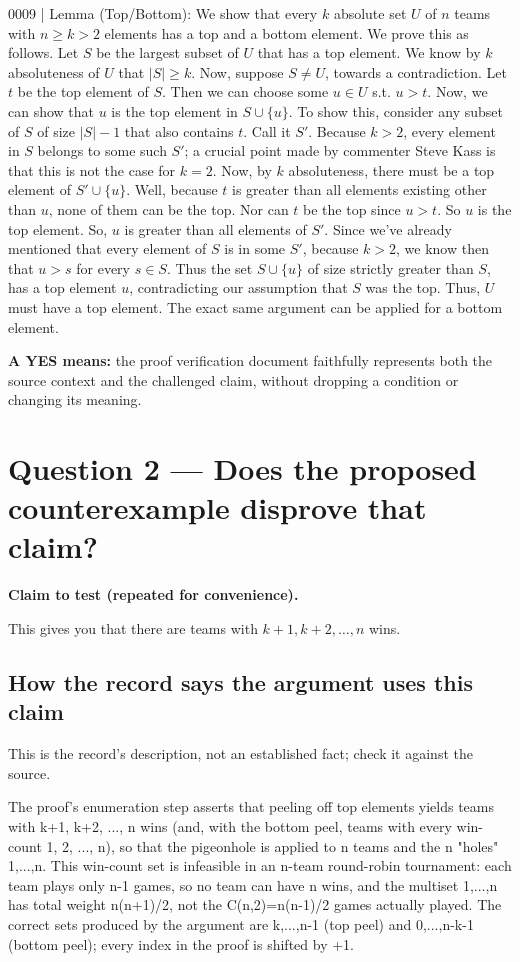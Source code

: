 \documentclass[11pt]{article}
\begin{document}
\begin{Vsrc}
0009 | Lemma (Top/Bottom): We show that every $k$ absolute set $U$ of $n$ teams with $n \geq k > 2$ elements has a top and a bottom element. We prove this as follows. Let $S$ be the largest subset of $U$ that has a top element. We know by $k$ absoluteness of $U$ that $|S| \geq k$. Now, suppose $S \neq U$, towards a contradiction. Let $t$ be the top element of $S$. Then we can choose some $u \in U$ s.t. $u > t$. Now, we can show that $u$ is the top element in $S \cup \{u\}$. To show this, consider any subset of $S$ of size $|S| - 1$ that also contains $t$. Call it $S'$. Because $k > 2$, every element in $S$ belongs to some such $S'$; a crucial point made by commenter Steve Kass is that this is not the case for $k = 2$. Now, by $k$ absoluteness, there must be a top element of $S' \cup \{u\}$. Well, because $t$ is greater than all elements existing other than $u$, none of them can be the top. Nor can $t$ be the top since $u>t$. So $u$ is the top element. So, $u$ is greater than all elements of $S'$. Since we've already mentioned that every element of $S$ is in some $S'$, because $k>2$, we know then that $u > s$ for every $s \in S$. Thus the set $S \cup \{u\}$ of size strictly greater than $S$, has a top element $u$, contradicting our assumption that $S$ was the top. Thus, $U$ must have a top element. The exact same argument can be applied for a bottom element.
\end{Vsrc}
\textbf{A YES means:} the proof verification document faithfully represents both the source context and the challenged claim, without dropping a condition or changing its meaning.
\section*{Question 2 --- Does the proposed counterexample disprove that claim?}
\textbf{Claim to test (repeated for convenience).}
\begin{Vsrc}
This gives you that there are teams with $k+1, k+2, \dots, n$ wins.
\end{Vsrc}
\subsection*{How the record says the argument uses this claim}
This is the record's description, not an established fact; check it against the source.
\begin{Vsrc}
The proof's enumeration step asserts that peeling off top elements yields teams with k+1, k+2, ..., n wins (and, with the bottom peel, teams with every win-count 1, 2, ..., n), so that the pigeonhole is applied to n teams and the n "holes" {1,...,n}. This win-count set is infeasible in an n-team round-robin tournament: each team plays only n-1 games, so no team can have n wins, and the multiset {1,...,n} has total weight n(n+1)/2, not the C(n,2)=n(n-1)/2 games actually played. The correct sets produced by the argument are {k,...,n-1} (top peel) and {0,...,n-k-1} (bottom peel); every index in the proof is shifted by +1.
\end{Vsrc}
\end{document}
